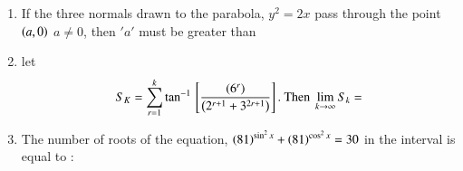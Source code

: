 \documentclass[journal]{IEEEtran}
\numberwithin{equation}{enumi}
\numberwithin{figure}{enumi}
\begin{document}
\begin{enumerate}
    \begin{figure}[H]
        \centering
    \end{figure}

    \item 
    If the three normals drawn to the parabola, $y^2 = 2x$ pass through the point $\left(a, 0\right)$ $a \neq 0$, then $'a'$ must be greater than
    \begin{enumerate}
    \end{enumerate}

    \item
    let  
    \begin{align*}
        S_K = \sum_{r=1}^k \tan^{-1} {}\left[\frac{\left(6^r\right)}{\left(2^{r+1} + 3^{2r+1}\right)}\right]. \text{ Then } \lim_{k\to\infty} S_k = 
    \end{align*}
    \begin{enumerate}
    \end{enumerate}

    \item 
    The number of roots of the equation, $\left(81\right)^{\sin^2{x}} + \left(81\right)^{\cos^2{x}} = 30$ in the interval  is equal to : 
    \begin{enumerate}
    \end{enumerate}


\end{enumerate}
\end{document}
